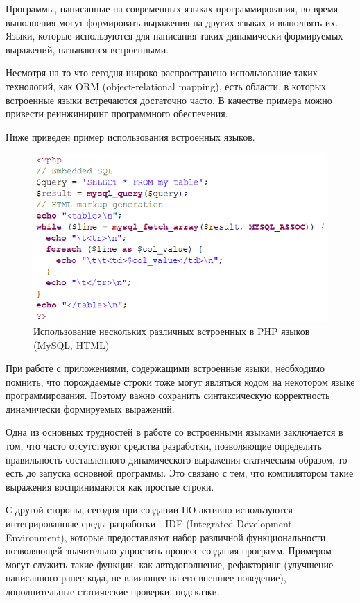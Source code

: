 Программы, написанные на современных языках программирования, во время выполнения могут формировать выражения на других языках и выполнять их. Языки, которые используются для написания таких динамически формируемых выражений, называются встроенными. 

Несмотря на то что сегодня широко распространено использование таких технологий, как ORM (object-relational mapping), есть области, в которых встроенные языки встречаются достаточно часто. В качестве примера можно привести реинжиниринг программного обеспечения. 

Ниже приведен пример использования встроенных языков.

\begin{figure}[h]
\label{PHP}
\centering
\includegraphics{Pictures/PHP.png}
\caption{Использование нескольких различных встроенных в PHP языков (MySQL, HTML)}
\end{figure}

При работе с приложениями, содержащими встроенные языки, необходимо помнить, что порождаемые строки тоже могут являться кодом на некотором языке программирования. Поэтому важно сохранить синтаксическую корректность динамически формируемых выражений. 

Одна из основных трудностей в работе со встроенными языками заключается в том, что часто отсутствуют средства разработки, позволяющие определить правильность составленного динамического выражения статическим образом, то есть до запуска основной программы. Это связано с тем, что компилятором такие выражения воспринимаются как простые строки.

С другой стороны, сегодня при создании ПО активно используются интегрированные среды разработки - IDE (Integrated Development Environment), которые предоставляют набор различной функциональности, позволяющей значительно упростить процесс создания программ. Примером могут служить такие функции, как автодополнение, рефакторинг (улучшение написанного ранее кода, не влияющее на его внешнее поведение), дополнительные статические проверки, подсказки. 

